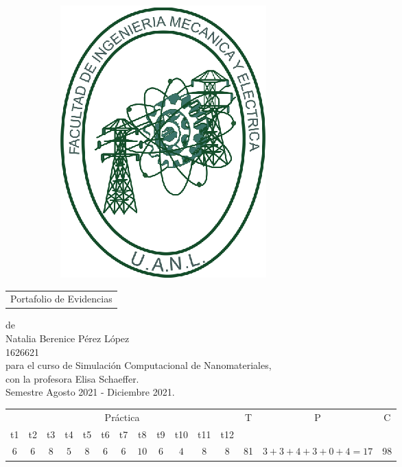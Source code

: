 \documentclass[letterpaper, 10 pt, conference]{article}
\begin{document}
\begin{scshape}
\begin{center}
\begin{figure}[h!]
\begin{subfigure}{0.2\linewidth}
			\includegraphics[width=\linewidth]{fime.eps}
		\end{subfigure}
	\end{figure}
	\vskip16mm
	\begin{tabular}{p{11cm}}
		\centering
		{\large Portafolio de Evidencias}
	\end{tabular}
	\vskip7mm
	{de}\\[7mm]
	{\large Natalia Berenice Pérez López}\\[3mm]
	{1626621}\\[7 mm]
	{para el curso de Simulación Computacional de Nanomateriales,}\\[3mm]
	{con la profesora Elisa Schaeffer.}\\[3mm]
	Semestre Agosto 2021 - Diciembre 2021. \\ [5 mm]
	\begin{table}[ht]
\centering

\begin{tabular}{|c|c|c|c|c|c|c|c|c|c|c|c|c|c|c|} 
 \hline
 \multicolumn{12}{|c|}{Práctica} & \multirow{2}{*}{T} & \multirow{2}{*}{P} & \multirow{2}{*}{C} \\
 \cline{1-12}
 t1 & t2 & t3 & t4 & t5 & t6 & t7 & t8 & t9 & t10 & t11 & t12 & & & \\
 \hline
 $6$ & $6$ & $8$ & $5$ & $8$ & $6$ & $6$ & $10$ & $6$ & $4$ & $8$ & $8$ & \multicolumn{1}{|c|}{81} & $3+3+4+3+0+4=17$ & \multicolumn{1}{|c|}{98}\\
 \hline
\end{tabular}
\label{Cuadro3}
\end{table}


\end{center}
\end{scshape}
\end{document}

